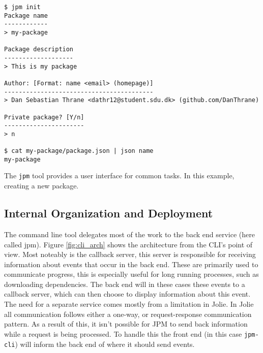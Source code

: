 \begin{listing}[H]
\begin{verbatim}
$ jpm init
Package name
------------
> my-package

Package description
-------------------
> This is my package

Author: [Format: name <email> (homepage)]
-----------------------------------------
> Dan Sebastian Thrane <dathr12@student.sdu.dk> (github.com/DanThrane)

Private package? [Y/n]
----------------------
> n

$ cat my-package/package.json | json name
my-package
\end{verbatim}

\caption{The \texttt{jpm} tool provides a user interface for common
    tasks. In this example, creating a new package.}

\label{lst:jpm_init}

\end{listing}


\subsection{Internal Organization and Deployment}

The command line tool delegates most of the work to the back end service (here
called jpm). Figure \ref{fig:cli_arch} shows the architecture from the CLI's
point of view. Most noteably is the callback server, this server is responsible
for receiving information about events that occur in the back end. These are
primarily used to communicate progress, this is especially useful for long
running processes, such as downloading dependencies. The back end will in these
cases these events to a callback server, which can then choose to display
information about this event. The need for a separate service comes mostly from
a limitation in Jolie. In Jolie all communication follows either a one-way, or
request-response communication pattern. As a result of this, it isn't possible
for JPM to send back information while a request is being processed. To handle
this the front end (in this case \texttt{jpm-cli}) will inform the
back end of where it should send events.

